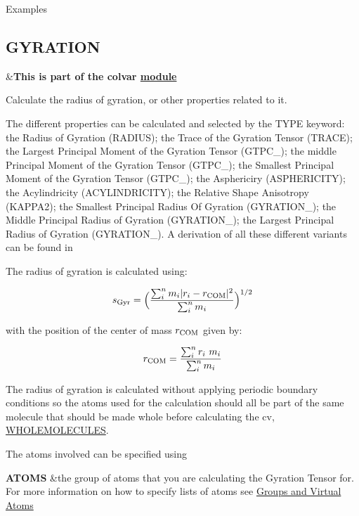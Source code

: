 \begin{DoxyParagraph}{Examples}

\end{DoxyParagraph}
\hypertarget{GYRATION}{}\subsection{G\+Y\+R\+A\+T\+I\+O\+N}\label{GYRATION}
\begin{TabularC}{2}
\hline
&{\bfseries  This is part of the colvar \hyperlink{mymodules}{module }}   \\
\end{TabularC}
Calculate the radius of gyration, or other properties related to it.

The different properties can be calculated and selected by the T\+Y\+P\+E keyword\+: the Radius of Gyration (R\+A\+D\+I\+U\+S); the Trace of the Gyration Tensor (T\+R\+A\+C\+E); the Largest Principal Moment of the Gyration Tensor (G\+T\+P\+C\+\_); the middle Principal Moment of the Gyration Tensor (G\+T\+P\+C\+\_); the Smallest Principal Moment of the Gyration Tensor (G\+T\+P\+C\+\_); the Asphericiry (A\+S\+P\+H\+E\+R\+I\+C\+I\+T\+Y); the Acylindricity (A\+C\+Y\+L\+I\+N\+D\+R\+I\+C\+I\+T\+Y); the Relative Shape Anisotropy (K\+A\+P\+P\+A2); the Smallest Principal Radius Of Gyration (G\+Y\+R\+A\+T\+I\+O\+N\+\_); the Middle Principal Radius of Gyration (G\+Y\+R\+A\+T\+I\+O\+N\+\_); the Largest Principal Radius of Gyration (G\+Y\+R\+A\+T\+I\+O\+N\+\_). A derivation of all these different variants can be found in \cite{Vymetal:2011gv}

The radius of gyration is calculated using\+:

\[ s_{\rm Gyr}=\Big ( \frac{\sum_i^{n} m_i \vert {r}_i -{r}_{\rm COM} \vert ^2 }{\sum_i^{n} m_i} \Big)^{1/2} \]

with the position of the center of mass ${r}_{\rm COM}$ given by\+:

\[ {r}_{\rm COM}=\frac{\sum_i^{n} {r}_i\ m_i }{\sum_i^{n} m_i} \]

The radius of gyration is calculated without applying periodic boundary conditions so the atoms used for the calculation should all be part of the same molecule that should be made whole before calculating the cv, \hyperlink{WHOLEMOLECULES}{W\+H\+O\+L\+E\+M\+O\+L\+E\+C\+U\+L\+E\+S}.

\begin{DoxyParagraph}{The atoms involved can be specified using}

\end{DoxyParagraph}
\begin{TabularC}{2}
\hline
{\bfseries  A\+T\+O\+M\+S } &the group of atoms that you are calculating the Gyration Tensor for. For more information on how to specify lists of atoms see \hyperlink{Group}{Groups and Virtual Atoms}   \\
\end{TabularC}


